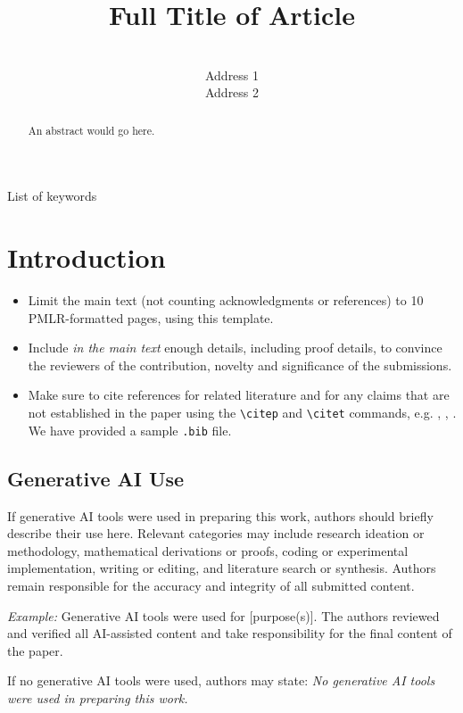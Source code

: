 \documentclass{l4dc2027}
\title[Short Title]{Full Title of Article}
\author{%
 \Name{Author Name1} \Email{abc@sample.com}\\
 \addr Address 1
 \AND
 \Name{Author Name2} \Email{xyz@sample.com}\\
 \addr Address 2%
}
\begin{document}
\maketitle

\begin{abstract}%
 An abstract would go here.%
\end{abstract}

\begin{keywords}%
  List of keywords%
\end{keywords}

\section{Introduction}

\begin{itemize}
  \item Limit the main text (not counting acknowledgments or references) to 10 PMLR-formatted pages, using this template.
  \item Include {\em in the main text} enough details, including proof details, to convince the reviewers of the contribution, novelty and significance of the submissions.
  \item Make sure to cite references for related literature and for any claims that are not established in the paper using the \texttt{\textbackslash citep} and \texttt{\textbackslash citet} commands, e.g. \citep{levine2016end}, \citet{doyle2003guaranteed}, \citet[Theorem 2.2.1]{vershynin2018high}. We have provided a sample \texttt{.bib} file.
\end{itemize}

\subsection*{Generative AI Use}

If generative AI tools were used in preparing this work, authors should briefly
describe their use here. Relevant categories may include research ideation or
methodology, mathematical derivations or proofs, coding or experimental
implementation, writing or editing, and literature search or synthesis.
Authors remain responsible for the accuracy and integrity of all submitted
content.

\textit{Example:} Generative AI tools were used for [purpose(s)]. The authors
reviewed and verified all AI-assisted content and take responsibility for the
final content of the paper.

If no generative AI tools were used, authors may state:
\textit{No generative AI tools were used in preparing this work.}



\end{document}
